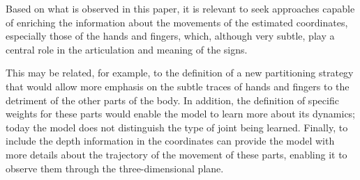 Based on what is observed in this paper, it is relevant to seek approaches capable of enriching the information about the movements of the estimated coordinates, especially those of the hands and fingers, which, although very subtle, play a central role in the articulation and meaning of the signs.

This may be related, for example, to the definition of a new partitioning strategy that would allow more emphasis on the subtle traces of hands and fingers to the detriment of the other parts of the body. In addition, the definition of specific weights for these parts would enable the model to learn more about its dynamics; today the model does not distinguish the type of joint being learned. Finally, to include the depth information in the coordinates can provide the model with more details about the trajectory of the movement of these parts, enabling it to observe them through the three-dimensional plane.